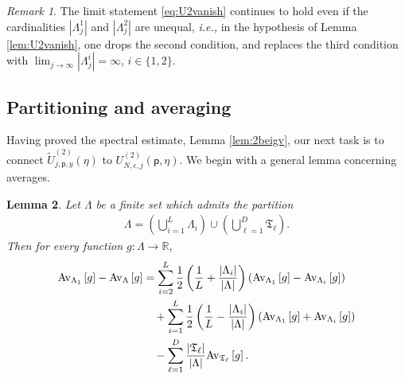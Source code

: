 \documentclass[11pt]{amsart}
\theoremstyle{plain}
\newtheorem{lemma}{Lemma}[section]
\theoremstyle{definition}
\theoremstyle{remark}
\newtheorem{remark}[lemma]{Remark}
\newcommand{\pt}{\mathsf{p}}
\newcommand{\Utwo}[3]{U^{(2)}_{{#1},{#2},{#3}}}
\newcommand{\Utildetwo}[3]{\tilde{U}^{(2)}_{{#1},{#2},{#3}}}
\newcommand{\avg}[2]{{\rm Av}_{#2}\left[{#1}\right]}
\begin{document}
\begin{remark}
The limit statement \eqref{eq:U2vanish} continues to hold even if the cardinalities $|\Lambda_j^1|$ and $|\Lambda_j^2|$ are unequal, \emph{i.e.,} in the hypothesis of Lemma \ref{lem:U2vanish}, one drops the second condition, and replaces the third condition with $\lim_{j\to\infty} |\Lambda_j^i|=\infty$, $i\in \{1,2\}$.
\end{remark}

\subsection{Partitioning and averaging}

Having proved the spectral estimate, Lemma \ref{lem:2beigv}, our next task is to connect $\Utildetwo{j}{\pt}{y}(\eta)$ to $\Utwo{N}{\epsilon}{j}(\pt,\eta)$. We begin with a general lemma concerning averages.

\begin{lemma}
\label{lem:avg}
Let $\Lambda$ be a finite set which admits the partition
\begin{align*}
\Lambda = \left(\bigcup_{i=1}^L \Lambda_i\right) \cup \left(\bigcup_{\ell=1}^D \mathfrak{T}_\ell\right).
\end{align*}
Then for every function $g: \Lambda\to\mathbb{R}$,
\begin{align*}
\avg{g}{\Lambda_1} - \avg{g}{\Lambda} &=  \sum_{i=2}^L \frac{1}{2}\left(\frac{1}{L} + \frac{|\Lambda_i|}{|\Lambda|}\right) \left(\avg{g}{\Lambda_1} - \avg{g}{\Lambda_i}\right) \\
\nonumber & \quad + \sum_{i=1}^L \frac{1}{2}\left(\frac{1}{L} - \frac{|\Lambda_i|}{|\Lambda|}\right) \left(\avg{g}{\Lambda_1} + \avg{g}{\Lambda_i}\right) \\
\nonumber & \quad - \sum_{\ell=1}^D \frac{|\mathfrak{T}_\ell|}{|\Lambda|} \avg{g}{\mathfrak{T}_\ell}.
\end{align*}
\end{lemma}
\end{document}
